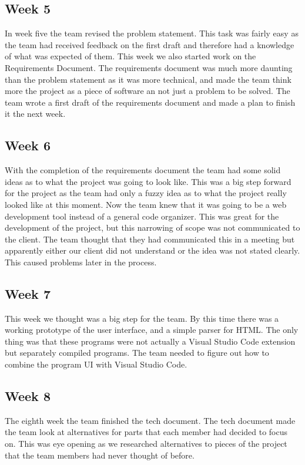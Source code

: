 \documentclass[letterpaper,10pt,titlepage,draftclsnofoot,onecolumn,onesided] {IEEEtran}
\begin{document}
	\subsection{Week 5}
	In week five the team revised the problem statement.
	This task was fairly easy as the team had received feedback on the first draft and therefore had a knowledge of what was expected of them.
	This week we also started work on the Requirements Document. 
	The requirements document was much more daunting than the problem statement as it was more technical, and made the team think more the project as a piece of software an not just a problem to be solved.
	The team wrote a first draft of the requirements document and made a plan to finish it the next week.
	
	\subsection{Week 6}
	With the completion of the requirements document the team had some solid ideas as to what the project was going to look like.
	This was a big step forward for the project as the team had only a fuzzy idea as to what the project really looked like at this moment.
	Now the team knew that it was going to be a web development tool instead of a general code organizer.
	This was great for the development of the project, but this narrowing of scope was not communicated to the client. 
	The team thought that they had communicated this in a meeting but apparently either our client did not understand or the idea was not stated clearly.
	This caused problems later in the process.
	
	\subsection{Week 7}
	This week we thought was a big step for the team. 
 	By this time there was a working prototype of the user interface, and a simple parser for HTML.
	The only thing was that these programs were not actually a Visual Studio Code extension but separately compiled programs.
	The team needed to figure out how to combine the program UI with Visual Studio Code.
	
	\subsection{Week 8}
	The eighth week the team finished the tech document.
	The tech document made the team look at alternatives for parts that each member had decided to focus on.
	This was eye opening as we researched alternatives to pieces of the project that the team members had never thought of before.
	
\end{document}
